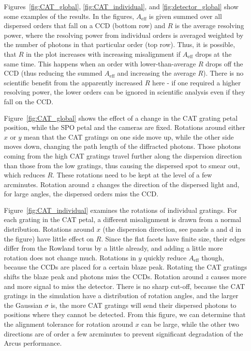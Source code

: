 \documentclass[12pt]{spieman}  %
\begin{document}
\begin{spacing}{2}
Figures~\ref{fig:CAT_global}, \ref{fig:CAT_individual}, and \ref{fig:detector_global} show some examples of the results. In the figures, $A_\mathrm{eff}$ is given summed over all dispersed orders that fall on a CCD (bottom row) and $R$ is the average resolving power, where the resolving power from individual orders is averaged weighted by the number of photons in that particular order (top row). Thus, it is possible, that $R$ in the plot increases with increasing misalignment if $A_\mathrm{eff}$ drops at the same time. This happens when an order with lower-than-average $R$ drops off the CCD (thus reducing the summed $A_\mathrm{eff}$ and increasing the average $R$). There is no scientific benefit from the apparently increased $R$ here - if one required a higher resolving power, the lower orders can be ignored in scientific analysis even if they fall on the CCD.


Figure~\ref{fig:CAT_global} shows the effect of a change in the CAT grating petal position, while the SPO petal and the cameras are fixed. Rotations around either $x$ or $y$ mean that the CAT gratings on one side move up, while the other side moves down, changing the path length of the diffracted photons. Those photons coming from the high CAT gratings travel further along the dispersion direction than those from the low gratings, thus causing the dispersed spot to smear out, which reduces $R$. These rotations need to be kept at the level of a few arcminutes. Rotation around $z$ changes the direction of the dispersed light and, for large angles, the dispersed orders miss the CCD.

Figure~\ref{fig:CAT_individual} examines the rotations of individual gratings. For each grating in the CAT petal, a different misalignment is drawn from a normal distribution. Rotations around $x$ (the dispersion direction, see panels a and d in the figure) have little effect on $R$. Since the flat facets have finite size, their edges differ from the Rowland torus by a little already, and adding a little more rotation does not change much. Rotations in $y$ quickly reduce $A_\mathrm{eff}$ though, because the CCDs are placed for a certain blaze peak. Rotating the CAT gratings shifts the blaze peak and photons miss the CCDs. Rotation around $z$ causes more and more signal to miss the detector. There is no sharp cut-off, because the CAT gratings in the simulation have a distribution of rotation angles, and the larger the Gaussian $\sigma$ is, the more CAT gratings will send their dispersed photons to positions where they cannot be detected. From this figure, we can determine that the alignment tolerance for rotation around $x$ can be large, while the other two directions are of order a few arcminutes to prevent significant degradation of the Arcus performance.


\end{spacing}
\end{document}
